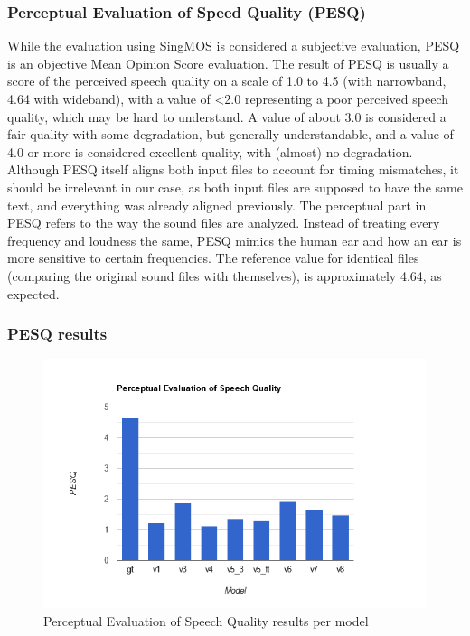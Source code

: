 \documentclass[a4paper]{article}
\begin{document}
	\subsubsection{Perceptual Evaluation of Speed Quality (PESQ)}
	While the evaluation using SingMOS is considered a subjective evaluation, PESQ
	is an objective Mean Opinion Score evaluation. The result of PESQ is usually a
	score of the perceived speech quality on a scale of 1.0 to 4.5 (with narrowband,
	4.64 with wideband), with a value of <2.0 representing a poor perceived speech
	quality, which may be hard to understand. A value of about 3.0 is considered a
	fair quality with some degradation, but generally understandable, and a value of
	4.0 or more is considered excellent quality, with (almost) no degradation.
	Although PESQ itself aligns both input files to account for timing mismatches,
	it should be irrelevant in our case, as both input files are supposed to have
	the same text, and everything was already aligned previously. The perceptual
	part in PESQ refers to the way the sound files are analyzed. Instead of treating
	every frequency and loudness the same, PESQ mimics the human ear and how an ear
	is more sensitive to certain frequencies. The reference value for identical
	files (comparing the original sound files with themselves), is approximately 4.64, as
	expected.
	
	\subsubsection{PESQ results}
	\begin{figure}[hbtp]
		\includegraphics[width=\textwidth]{evaluation/graphs/PESQ.png}
		\caption{Perceptual Evaluation of Speech Quality results per model}
		\label{fig:pesq_results}
	\end{figure}
	
\end{document}
